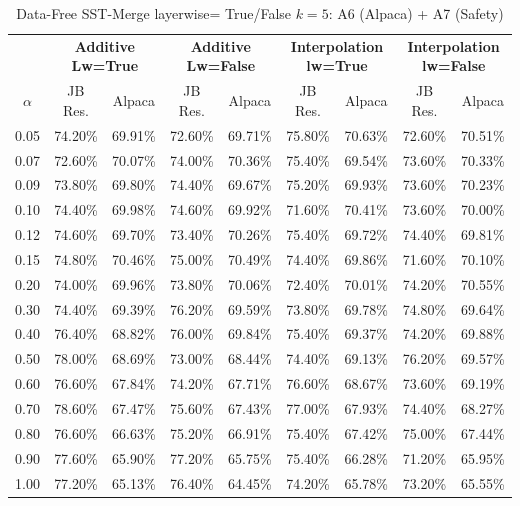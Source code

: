 \begin{table}[h]
\centering
\caption{Data-Free SST-Merge layerwise= True/False $k=5$: A6 (Alpaca) + A7 (Safety)}
\label{tab:res_a6_a7_data_free_sst_5}
\begin{tabular}{c|cc|cc|cc|cc}
\hline
 & \multicolumn{2}{c|}{\textbf{Additive Lw=True}} & \multicolumn{2}{c|}{\textbf{Additive Lw=False}} & \multicolumn{2}{c|}{\textbf{Interpolation lw=True}}& \multicolumn{2}{c}{\textbf{Interpolation lw=False}} \\
$\alpha$ & JB Res. & Alpaca & JB Res. & Alpaca & JB Res. & Alpaca & JB Res. & Alpaca \\
\hline
0.05 & 74.20\% & 69.91\% & 72.60\% & 69.71\% & 75.80\% & 70.63\% & 72.60\% & 70.51\% \\
0.07 & 72.60\% & 70.07\% & 74.00\% & 70.36\% & 75.40\% & 69.54\% & 73.60\% & 70.33\% \\
0.09 & 73.80\% & 69.80\% & 74.40\% & 69.67\% & 75.20\% & 69.93\% & 73.60\% & 70.23\% \\
0.10 & 74.40\% & 69.98\% & 74.60\% & 69.92\% & 71.60\% & 70.41\% & 73.60\% & 70.00\% \\
0.12 & 74.60\% & 69.70\% & 73.40\% & 70.26\% & 75.40\% & 69.72\% & 74.40\% & 69.81\% \\
0.15 & 74.80\% & 70.46\% & 75.00\% & 70.49\% & 74.40\% & 69.86\% & 71.60\% & 70.10\% \\
0.20 & 74.00\% & 69.96\% & 73.80\% & 70.06\% & 72.40\% & 70.01\% & 74.20\% & 70.55\% \\
0.30 & 74.40\% & 69.39\% & 76.20\% & 69.59\% & 73.80\% & 69.78\% & 74.80\% & 69.64\% \\
0.40 & 76.40\% & 68.82\% & 76.00\% & 69.84\% & 75.40\% & 69.37\% & 74.20\% & 69.88\% \\
0.50 & 78.00\% & 68.69\% & 73.00\% & 68.44\% & 74.40\% & 69.13\% & 76.20\% & 69.57\% \\
0.60 & 76.60\% & 67.84\% & 74.20\% & 67.71\% & 76.60\% & 68.67\% & 73.60\% & 69.19\% \\
0.70 & 78.60\% & 67.47\% & 75.60\% & 67.43\% & 77.00\% & 67.93\% & 74.40\% & 68.27\% \\
0.80 & 76.60\% & 66.63\% & 75.20\% & 66.91\% & 75.40\% & 67.42\% & 75.00\% & 67.44\% \\
0.90 & 77.60\% & 65.90\% & 77.20\% & 65.75\% & 75.40\% & 66.28\% & 71.20\% & 65.95\% \\
1.00 & 77.20\% & 65.13\% & 76.40\% & 64.45\% & 74.20\% & 65.78\% & 73.20\% & 65.55\% \\
\hline
\end{tabular}
\end{table}
\FloatBarrier


